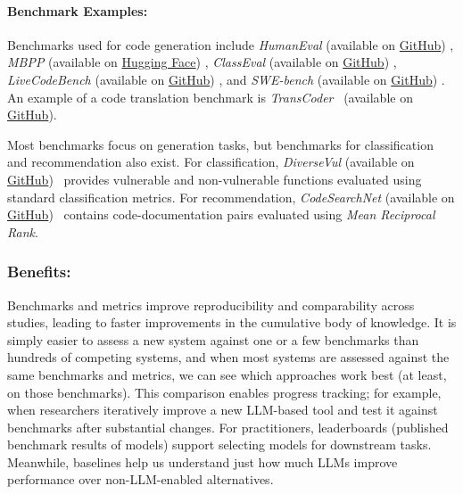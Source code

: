 \documentclass[smallextended]{svjour3}
\newcommand{\guidelinesubsubsection}[1]{\subsubsection{\bfseries #1:}}
\newcommand{\guidelinesubsubsection}[1]{\subsubsection{#1}}
\begin{document}
\paragraph{Benchmark Examples:}

Benchmarks used for code generation include \emph{HumanEval} (available on \href{https://github.com/openai/human-eval}{GitHub}) \cite{DBLP:journals/corr/abs-2107-03374}, \emph{MBPP} (available on \href{https://huggingface.co/datasets/google-research-datasets/mbpp}{Hugging Face}) \cite{DBLP:journals/corr/abs-2108-07732},
\emph{ClassEval} (available on \href{https://github.com/FudanSELab/ClassEval}{GitHub}) \cite{DBLP:conf/icse/Du0WWL0FS0L24}, \emph{LiveCodeBench} (available on \href{https://github.com/LiveCodeBench/LiveCodeBench}{GitHub}) \cite{DBLP:journals/corr/abs-2403-07974}, and \emph{SWE-bench} (available on \href{https://github.com/swe-bench/SWE-bench}{GitHub}) \cite{DBLP:conf/iclr/JimenezYWYPPN24}.
An example of a code translation benchmark is \emph{TransCoder}~\cite{DBLP:conf/nips/RoziereLCL20} (available on \href{https://github.com/facebookresearch/CodeGen}{GitHub}). 

Most benchmarks focus on generation tasks, but benchmarks for classification and recommendation also exist.
For classification, \emph{DiverseVul} (available on \href{https://github.com/wagner-group/diversevul}{GitHub})~\cite{DBLP:conf/raid/0001DACW23} provides vulnerable and non-vulnerable functions evaluated using standard classification metrics.
For recommendation, \emph{CodeSearchNet} (available on \href{https://github.com/github/CodeSearchNet}{GitHub})~\cite{DBLP:journals/corr/abs-1909-09436} contains code-documentation pairs evaluated using \emph{Mean Reciprocal Rank}.

\guidelinesubsubsection{Benefits}

Benchmarks and metrics improve reproducibility and comparability across studies, leading to faster improvements in the cumulative body of knowledge. It is simply easier to assess a new system against one or a few benchmarks than hundreds of competing systems, and when most systems are assessed against the same benchmarks and metrics, we can see which approaches work best (at least, on those benchmarks). This comparison enables progress tracking; for example, when researchers iteratively improve a new LLM-based tool and test it against benchmarks after substantial changes. For practitioners, leaderboards (published benchmark results of models) support selecting models for downstream tasks. Meanwhile, baselines help us understand just how much LLMs improve performance over non-LLM-enabled alternatives. 
\end{document}
